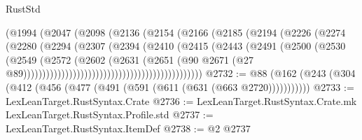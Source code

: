 \begin{lexlean}{RustStd}
\begin{coremodule}
                                            (@1994
                                              (@2047
                                                (@2098
                                                  (@2136
                                                    (@2154
                                                      (@2166
                                                        (@2185
                                                          (@2194
                                                            (@2226
                                                              (@2274
                                                                (@2280
                                                                  (@2294
                                                                    (@2307
                                                                      (@2394
                                                                        (@2410
                                                                          (@2415
                                                                            (@2443
                                                                              (@2491
                                                                                (@2500
                                                                                  (@2530
                                                                                    (@2549
                                                                                      (@2572
                                                                                        (@2602
                                                                                          (@2631
                                                                                            (@2651
                                                                                              (@90
                                                                                                @2671
                                                                                                (@27
                                                                                                  @89)))))))))))))))))))))))))))))))))))))))))))))))
@2732 := @88 (@162 (@243 (@304 (@412 (@456 (@477 (@491 (@591 (@611 (@631 (@663 @2720)))))))))))
@2733 := LexLeanTarget.RustSyntax.Crate
@2736 := LexLeanTarget.RustSyntax.Crate.mk LexLeanTarget.RustSyntax.Profile.std
@2737 := LexLeanTarget.RustSyntax.ItemDef
@2738 := @2 @2737

\end{coremodule}
\end{lexlean}
